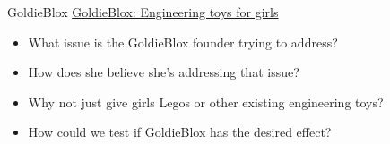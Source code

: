 \documentclass{beamer}
\begin{document}
\begin{frame}{GoldieBlox}
\href{http://www.youtube.com/watch?v=y-AtZfNU3zw}{GoldieBlox: Engineering toys for girls}
\begin{itemize}
\item What issue is the GoldieBlox founder trying to address?
\item How does she believe she's addressing that issue?
\item Why not just give girls Legos or other existing engineering toys?
\item How could we test if GoldieBlox has the desired effect?
\end{itemize}
\end{frame}
\end{document}
